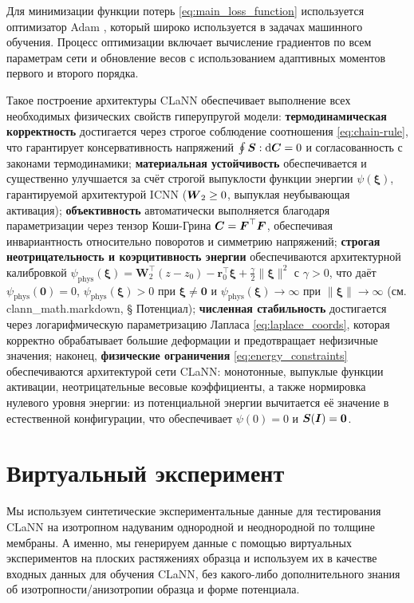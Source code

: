Для минимизации функции потерь \eqref{eq:main_loss_function} используется оптимизатор Adam \cite{kingma2014adam}, 
который широко используется в задачах машинного обучения. 
Процесс оптимизации включает вычисление градиентов по всем параметрам сети и обновление весов 
с использованием адаптивных моментов первого и второго порядка.

Такое построение архитектуры CLaNN обеспечивает выполнение всех необходимых физических свойств гиперупругой модели: 
\textbf{термодинамическая корректность} достигается через строгое соблюдение соотношения \eqref{eq:chain-rule}, 
что гарантирует консервативность напряжений $\oint \boldsymbol{S}:\mathrm{d}\boldsymbol{C} = 0$ и согласованность с законами 
термодинамики; 
\textbf{материальная устойчивость} обеспечивается и существенно улучшается за счёт строгой выпуклости функции энергии 
$\psi(\boldsymbol{\xi})$, гарантируемой архитектурой ICNN ($\boldsymbol{W}_2 \ge 0$, выпуклая неубывающая активация); 
\textbf{объективность} автоматически выполняется благодаря параметризации через тензор 
Коши-Грина $\boldsymbol{C} = \boldsymbol{F}^{\top}\boldsymbol{F}$, обеспечивая инвариантность относительно поворотов и симметрию напряжений; 
\textbf{строгая неотрицательность и коэрцитивность энергии} обеспечиваются архитектурной калибровкой 
$\psi_{\mathrm{phys}}(\boldsymbol{\xi}) = \mathbf{W}_2^{\top}(z - z_0) - \mathbf{r}_0^{\top}\boldsymbol{\xi} + \tfrac{\gamma}{2}\|\boldsymbol{\xi}\|^2$ 
с $\gamma>0$, что даёт $\psi_{\mathrm{phys}}(\mathbf{0})=0$, $\psi_{\mathrm{phys}}(\boldsymbol{\xi})>0$ при $\boldsymbol{\xi}\ne\mathbf{0}$ и 
$\psi_{\mathrm{phys}}(\boldsymbol{\xi})\to\infty$ при $\|\boldsymbol{\xi}\|\to\infty$ (см. clann\_math.markdown, § Потенциал); 
\textbf{численная стабильность} достигается через логарифмическую параметризацию Лапласа \eqref{eq:laplace_coords}, которая корректно обрабатывает большие деформации и предотвращает нефизичные значения; 
наконец, \textbf{физические ограничения} \eqref{eq:energy_constraints} обеспечиваются архитектурой сети CLaNN: монотонные, выпуклые функции активации,
неотрицательные весовые коэффициенты, а также нормировка нулевого уровня энергии: из потенциальной энергии вычитается её значение в естественной конфигурации, что обеспечивает $\psi(0)=0$ и $\boldsymbol{S}(\boldsymbol{I})=\boldsymbol{0}$.



\section{Виртуальный эксперимент}

Мы используем синтетические экспериментальные данные для тестирования CLaNN 
на изотропном надуваним однородной и неоднородной по толщине мембраны. 
А именно, мы генерируем данные с помощью виртуальных экспериментов на плоских растяжениях образца и используем их в качестве входных данных для 
обучения CLaNN, без какого-либо дополнительного знания об изотропности/анизотропии образца и форме потенциала.
 
